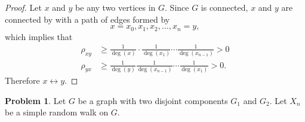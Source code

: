 \documentclass[oneside,reqno]{amsart}
\theoremstyle{definition}
\newtheorem{prob}{Problem}
\begin{document}
\begin{proof}
Let $x$ and $y$ be any two vertices in $G$. Since $G$ is connected, $x$ and $y$ are connected by with a path of edges formed by
\[
	x = x_0, x_1, x_2, \dotsc, x_n=y,
\] 
which implies that 
\begin{align*}
	\rho_{xy} & \geq \frac{1}{\deg(x)} \cdot \frac{1}{\deg(x_1)} \cdots \frac{1}{\deg(x_{n-1})} >0 \\
	\rho_{yx} & \geq \frac{1}{\deg(y)} \frac{1}{\deg(x_{n-1})} \cdots \frac{1}{\deg(x_1)}  >0 .
\end{align*}
Therefore $x \leftrightarrow y$.
\end{proof}

\begin{prob}
Let $G$ be a graph with two disjoint components $G_1$ and $G_2$. Let $X_n$ be a simple random walk on $G$.
\end{prob}
\end{document}
